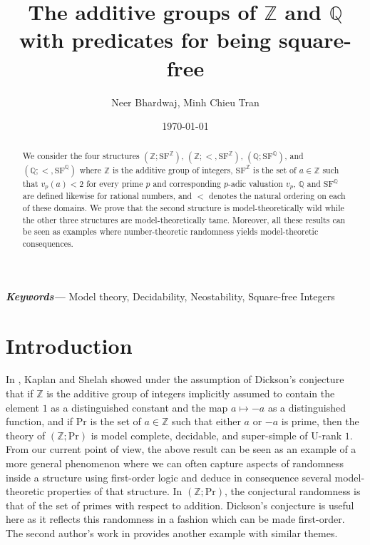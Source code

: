\documentclass[letterpaper]{amsart}
\newcommand{\qq}{\mathbb{Q}}
\newcommand{\zz}{\mathbb{Z}}
\newcommand{\NTP}{\mathrm{NTP}}
\newcommand{\SF}{\mathrm{SF}^\zz}
\newcommand{\SQ}{\mathrm{SF}^\qq}
\providecommand{\keywords}[1]
{
  \small	
  \textbf{\textit{Keywords---}} #1
}
\begin{document}
\sloppy


\title[ The groups $\mathbb{Z}$ and $\mathbb{Q}$ with predicates for being square-free]{The additive groups of $\mathbb{Z}$ and $\mathbb{Q}$ with predicates for being square-free}
\author{Neer Bhardwaj, Minh Chieu Tran}
\address{Department of Mathematics, University of Illinois at Urbana-
Champaign, Urbana, IL 61801, U.S.A}
\curraddr{}
\address{Department of Mathematics, University of Notre Dame, Notre Dame, IN 46556, U.S.A}
\curraddr{}
\date{\today}

\begin{abstract}
We consider the four structures $(\mathbb{Z}; \SF)$, $(\mathbb{Z}; <, \SF)$, $(\mathbb{Q}; \SQ)$,  and  $(\mathbb{Q}; <, \SQ)$ where $\mathbb{Z}$ is the additive group of integers, $\SF$ is the set of $a \in \mathbb{Z}$ such that $v_{p}(a) < 2$ for every prime $p$ and corresponding $p$-adic valuation $v_{p}$, $\mathbb{Q}$ and $\SQ$ are defined likewise for rational numbers, and $<$ denotes the natural ordering on each of these domains. We prove that the second structure is model-theoretically wild while the other three structures are model-theoretically tame. Moreover, all these results can be seen as examples where number-theoretic randomness yields model-theoretic consequences.
\end{abstract}

\keywords{Model theory, Decidability, Neostability, Square-free Integers}

\maketitle
\section{Introduction}

\noindent In  \cite{ShelahKaplan}, Kaplan and Shelah showed under the assumption of Dickson's conjecture that if  $\zz$ is the additive group of integers implicitly assumed to contain the element $1$ as a distinguished constant and the map $a \mapsto -a$ as a distinguished function, and if $\text{Pr}$ is the set of $ a \in \zz$  such that either  $ a$ or $-a$ is prime, then the theory of $(\zz; \text{Pr})$  is model complete, decidable, and super-simple of U-rank $1$. From our current point of view, the above result can be seen as an example of a more general phenomenon where we can often capture aspects of randomness inside a structure using first-order logic and deduce in consequence  several model-theoretic properties of that structure. In $(\zz; \text{Pr})$, the conjectural randomness is that of the set of primes with respect to addition. Dickson's conjecture is useful here as it reflects this randomness in a fashion which can be made first-order. The second author's work in \cite{Minh} provides another example with similar themes. 
\end{document}
